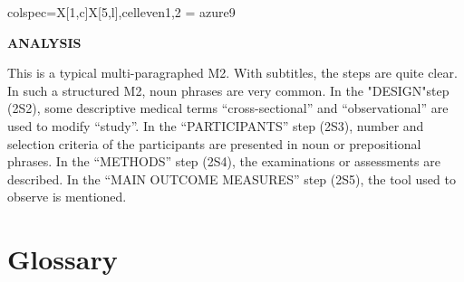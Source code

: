 \documentclass{ctexbook}
\begin{document}
\begin{sample}[label={myautocounter}]{\heiti}
{\begin{tblr}{colspec={X[1,c]X[5,l]},cell{even}{1,2} = {azure9}}
    \bottomrule
  \end{tblr}
  }


  \noindent \textbf{ANALYSIS}

  This is a typical multi-paragraphed M2. With subtitles, the steps are quite clear. In such a structured M2, noun phrases are very common. In the "DESIGN"step (2S2), some descriptive medical terms ``cross-sectional'' and ``observational'' are used to modify ``study''. In the ``PARTICIPANTS'' step (2S3), number and selection criteria of the participants are presented in noun or prepositional phrases. In the ``METHODS'' step (2S4), the examinations or assessments are described. In the ``MAIN OUTCOME MEASURES'' step (2S5), the tool used to observe is mentioned.

\end{sample}

\section{Glossary}
\end{document}
